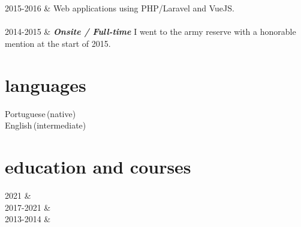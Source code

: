 \documentclass[]{cv-mauri}
\begin{document}
\begin{tabularcv}
		    \\[\vspacepar]
		    \\[\vspacepar]
    2015-2016   &   
                    \newline
                    Web applications using PHP/Laravel and VueJS.
                    \\[\vspacepar]
                    \\[\vspacepar]
	2014-2015   &   
					\textbf{\textit{Onsite / Full-time}}
					\newline
					I went to the army reserve with a honorable mention at the start of 2015.
\end{tabularcv}

\section*{languages}
\begin{tabularcv}
    Portuguese\,(native) \\
    English\,(intermediate)
\end{tabularcv}

\section*{education and courses}
\begin{tabularcv}
	2021   &   
					\\[\vspacepar]
    2017-2021   &   
                    \\[\vspacepar] %
    2013-2014   &   
\end{tabularcv}

\end{document}
